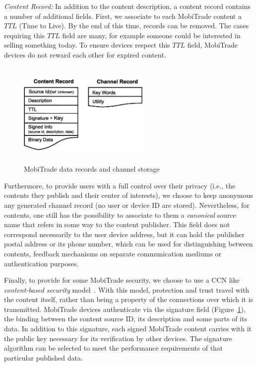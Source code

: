 \emph{Content Record:} In addition to the content description, a content record contains a number of additional fields. First, we associate to each MobiTrade content a $TTL$ (Time to Live). By the end of this time, records can be removed. The cases requiring this $TTL$ field are many, for example someone could be interested in selling something today. To ensure devices respect this $TTL$ field, MobiTrade devices do not reward each other for expired content.

\begin{figure}[!h]
\centering
\includegraphics[width=2.5in,height=2in]{Chapitre5/ContentsInterestsRecords.eps}
\vspace{-0.1in}
\caption{MobiTrade data records and channel storage}
\label{records}
\vspace{-0.2in}
\end{figure}

Furthermore, to provide users with a full control over their privacy (i.e., the contents they publish and their center of interests), we choose to keep anonymous any generated channel record (no user or device ID are stored). Nevertheless, for contents, one still has the possibility to associate to them a \emph{canonical} source name that refers in some way to the content publisher. This field does not correspond necessarily to the user device address, but it can hold the publisher postal address or its phone number, which can be used for distinguishing between contents, feedback mechanisms on separate communication mediums or authentication purposes.

Finally, to provide for some MobiTrade security, we choose to use a CCN like \emph{content-based security} model~\cite{CCN}. With this model, protection and trust travel with the content itself, rather than being a property of the connections over which it is transmitted.
MobiTrade devices authenticate via the signature field (Figure~\ref{records}), the binding between the content source ID, its description and some parts of its data. In addition to this signature, each signed MobiTrade content carries with it the public key necessary for its verification by other devices. The signature algorithm can be selected to meet the performance requirements of that particular published data.

